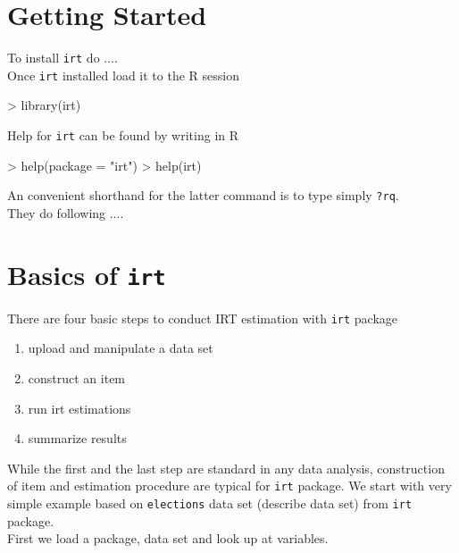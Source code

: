 \documentclass{amsart}
\newcommand{\Rpackage}[1]{{\texttt{#1}}}
\newcommand{\R}{{\normalfont\textsf{R }}{}}
\begin{document}
\section{Getting Started}
To install \Rpackage{irt} do .... \\

Once \Rpackage{irt} installed load it to the \R session
\begin{Schunk}
\begin{Sinput}
> library(irt)
\end{Sinput}
\end{Schunk}

Help for \Rpackage{irt} can be found by writing in \R 
\begin{Schunk}
\begin{Sinput}
> help(package = "irt")
> help(irt)
\end{Sinput}
\end{Schunk}
An convenient shorthand for the latter command is to type simply
\texttt{?rq}.\\

They do following ....


\newpage
\section{Basics of \Rpackage{irt}}
There are four basic steps to conduct IRT estimation with \Rpackage{irt} package
\begin{enumerate}
	\item upload and manipulate a data set
	\item construct an item
	\item run irt estimations
	\item summarize results
\end{enumerate}
While the first and the last step are standard in any data analysis, construction of item and estimation procedure
are typical for \Rpackage{irt} package. We start with very simple example based on {\tt elections} data set (describe data set)
from \Rpackage{irt} package. \\
First we load a package, data set and look up at variables.
\end{document}
